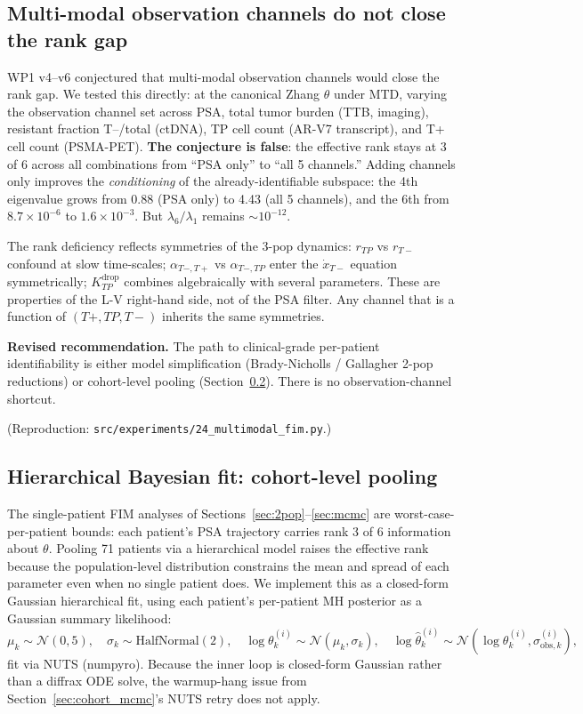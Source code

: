 \documentclass[11pt]{article}
\newcommand{\Kdrop}{K_{TP}^{\text{drop}}}
\newcommand{\Tplus}{T{+}}
\newcommand{\Tminus}{T{-}}
\begin{document}
\subsection{Multi-modal observation channels do not close the rank gap}\label{sec:multimodal}

WP1 v4--v6 conjectured that multi-modal observation channels would close
the rank gap. We tested this directly: at the canonical Zhang $\theta$
under MTD, varying the observation channel set across PSA, total tumor
burden (TTB, imaging), resistant fraction T--/total (ctDNA), TP cell count
(AR-V7 transcript), and T+ cell count (PSMA-PET). \textbf{The conjecture is
false}: the effective rank stays at 3 of 6 across all combinations from
``PSA only'' to ``all 5 channels.'' Adding channels only improves the
\emph{conditioning} of the already-identifiable subspace: the 4th eigenvalue
grows from 0.88 (PSA only) to 4.43 (all 5 channels), and the 6th from
$8.7 \times 10^{-6}$ to $1.6 \times 10^{-3}$. But $\lambda_6 / \lambda_1$
remains $\sim 10^{-12}$.

The rank deficiency reflects symmetries of the 3-pop dynamics: $r_{TP}$ vs
$r_{\Tminus}$ confound at slow time-scales; $\alpha_{\Tminus,\Tplus}$ vs
$\alpha_{\Tminus,TP}$ enter the $\dot{x}_{\Tminus}$ equation symmetrically;
$\Kdrop$ combines algebraically with several parameters. These are properties
of the L-V right-hand side, not of the PSA filter. Any channel that is a
function of $(\Tplus, TP, \Tminus)$ inherits the same symmetries.

\textbf{Revised recommendation.} The path to clinical-grade per-patient
identifiability is either model simplification (Brady-Nicholls / Gallagher
2-pop reductions) or cohort-level pooling (Section~\ref{sec:hier}). There
is no observation-channel shortcut.

(Reproduction: \texttt{src/experiments/24\_multimodal\_fim.py}.)

\subsection{Hierarchical Bayesian fit: cohort-level pooling}\label{sec:hier}

The single-patient FIM analyses of Sections~\ref{sec:2pop}--\ref{sec:mcmc} are
worst-case-per-patient bounds: each patient's PSA trajectory carries rank 3 of 6
information about $\theta$. Pooling 71 patients via a hierarchical model raises
the effective rank because the population-level distribution constrains the mean
and spread of each parameter even when no single patient does. We implement
this as a closed-form Gaussian hierarchical fit, using each patient's
per-patient MH posterior as a Gaussian summary likelihood:
\begin{equation*}
\mu_k \sim \mathcal{N}(0, 5), \quad
\sigma_k \sim \text{HalfNormal}(2), \quad
\log \theta_k^{(i)} \sim \mathcal{N}(\mu_k, \sigma_k), \quad
\log \hat\theta_k^{(i)} \sim \mathcal{N}(\log\theta_k^{(i)}, \sigma^{(i)}_{\text{obs},k}),
\end{equation*}
fit via NUTS (numpyro). Because the inner loop is closed-form Gaussian rather
than a diffrax ODE solve, the warmup-hang issue from Section~\ref{sec:cohort_mcmc}'s
NUTS retry does not apply.
\end{document}
